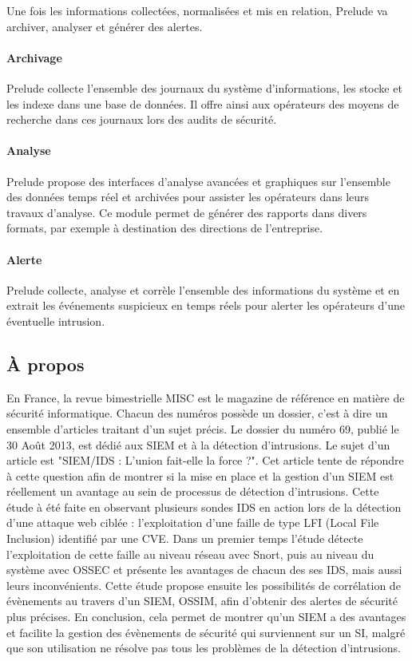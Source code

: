 \documentclass[a4paper,11pt,french]{article}
\begin{document}
Une fois les informations collectées, normalisées et mis en relation, Prelude va archiver, analyser et générer des alertes.
\paragraph{Archivage} Prelude collecte l'ensemble des journaux du système d'informations, les stocke et les indexe dans une base de données. Il offre ainsi aux opérateurs des moyens de recherche dans ces journaux lors des audits de sécurité.

\paragraph{Analyse} Prelude propose des interfaces d'analyse avancées et graphiques sur l'ensemble des données temps réel et archivées pour assister les opérateurs dans leurs travaux d'analyse. Ce module permet de générer des rapports dans divers formats, par exemple à destination des directions de l'entreprise.

\paragraph{Alerte} Prelude collecte, analyse et corrèle l'ensemble des informations du système et en extrait les événements suspicieux en temps réels pour alerter les opérateurs d'une éventuelle intrusion.

\subsection{À propos}
En France, la revue bimestrielle MISC est le magazine de référence en matière de sécurité informatique. Chacun des numéros possède un dossier, c’est à dire un ensemble d’articles traitant d’un sujet précis. Le dossier du numéro 69, publié le 30 Août 2013, est dédié aux SIEM et à la détection d’intrusions. Le sujet d’un article est "SIEM/IDS : L’union fait-elle la force ?". Cet article tente de répondre à cette question afin de montrer si la mise en place et la gestion d’un SIEM est réellement un avantage au sein de processus de détection d’intrusions. Cette étude à été faite en observant plusieurs sondes IDS en action lors de la détection d’une attaque web ciblée : l’exploitation d’une faille de type LFI (Local File Inclusion) identifié par une CVE. Dans un premier temps l’étude détecte l’exploitation de cette faille au niveau réseau avec Snort, puis au niveau du système avec OSSEC et présente les avantages de chacun des ses IDS, mais aussi leurs inconvénients. Cette étude propose ensuite les possibilités de corrélation de évènements au travers d’un SIEM, OSSIM, afin d’obtenir des alertes de sécurité plus précises. En conclusion, cela permet de montrer qu’un SIEM a des avantages et facilite la gestion des évènements de sécurité qui surviennent sur un SI, malgré que son utilisation ne résolve pas tous les problèmes de la détection d’intrusions.
\end{document}
